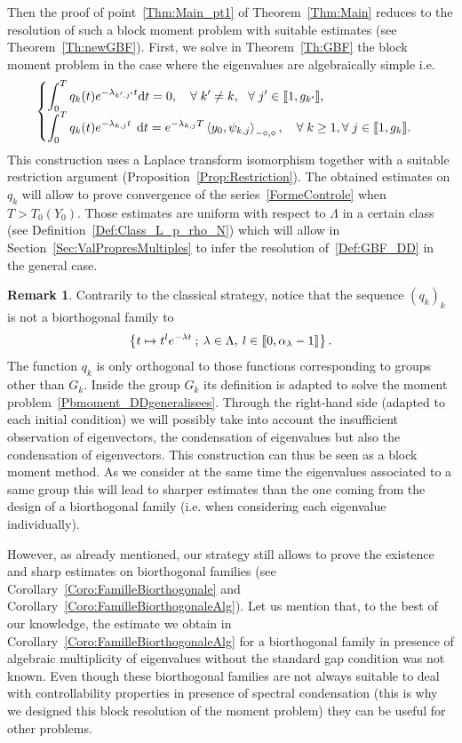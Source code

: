 \documentclass[10pt]{amsart}
\theoremstyle{definition}\newtheorem{defi}[theo]{Definition}\newtheorem{rema}[theo]{Remark}\newtheorem{exam}[theo]{Example}\newtheorem{exem}[theo]{Example}\newtheorem{nota}[theo]{Notation}
\newcommand{\llbracket}{\mathopen{[\mkern -2.7mu[}}
\newcommand{\rrbracket}{\mathclose{]\mkern -2.7mu]}}
\newcommand{\inter}[2]{\llbracket #1,#2 \rrbracket}
\newcommand{\Fzp}{Y_0}
\newcommand{\dual}[2]{\left\langle #1, #2 \right\rangle_{-\diamond,\diamond}}
\newcommand{\n}{g}
\newcommand{\md}{\mathrm{d}}
\let\oldforall\forall
\renewcommand*{\forall}{\mathrel{\oldforall}}
\begin{document}
Then the proof of point~\eqref{Thm:Main_pt1} of Theorem~\ref{Thm:Main} reduces to the resolution of such a block moment problem with suitable estimates (see Theorem~\ref{Th:newGBF}). First, we solve in Theorem~\ref{Th:GBF} the block moment problem in the case where the eigenvalues are algebraically simple i.e.
\begin{equation}\label{Def:GBF}
\begin{cases}
\displaystyle\int_0^T q_k(t) e^{-\lambda_{k',j'} t} \md t = 0, \quad \forall k' \neq k, \ \ \forall j'\in \inter{1}{\n_{k'}},
\\[0.15em]
\displaystyle \int_0^T q_k(t) e^{-\lambda_{k,j} t} \;\,\md t = e^{-\lambda_{k,j}T} \dual{y_0}{\psi_{k,j}}, \quad \forall k \geq 1, \forall j \in \inter{1}{\n_k}.
\end{cases}
\end{equation}
This construction uses a Laplace transform isomorphism together with a suitable restriction argument (Proposition~\ref{Prop:Restriction}). The obtained estimates on $q_k$ will allow to prove convergence of the series~\eqref{FormeControle} when $T>T_0(\Fzp)$. Those estimates are uniform with respect to $\Lambda$ in a certain class (see Definition~\ref{Def:Class_L_p_rho_N}) which will allow in Section~\ref{Sec:ValPropresMultiples} to infer the resolution of~\eqref{Def:GBF_DD} in the general case.

\begin{rema}
Contrarily to the classical strategy, notice that the sequence $(q_k)_k$ is not a biorthogonal family to
\[
\left\{ t \mapsto t^l e^{-\lambda t} \: ; \: \lambda \in \Lambda, \: l \in \inter{0}{\alpha_\lambda -1} \right\}.
\]
The function $q_k$ is only orthogonal to those functions corresponding to groups other than $G_k$. Inside the group $G_k$ its definition is adapted to solve the moment problem~\eqref{Pbmoment_DDgeneralisees}. Through the right-hand side (adapted to each initial condition) we will possibly take into account the insufficient observation of eigenvectors, the condensation of eigenvalues but also the condensation of eigenvectors. This construction can thus be seen as a block moment method. As we consider at the same time the eigenvalues associated to a same group this will lead to sharper estimates than the one coming from the design of a biorthogonal family (i.e. when considering each eigenvalue individually).

However, as already mentioned, our strategy still allows to prove the existence and sharp estimates on biorthogonal families (see Corollary~\ref{Coro:FamilleBiorthogonale} and Corollary~\ref{Coro:FamilleBiorthogonaleAlg}). Let us mention that, to the best of our knowledge, the estimate we obtain in Corollary~\ref{Coro:FamilleBiorthogonaleAlg} for a biorthogonal family in presence of algebraic multiplicity of eigenvalues without the standard gap condition was not known. Even though these biorthogonal families are not always suitable to deal with controllability properties in presence of spectral condensation (this is why we designed this block resolution of the moment problem) they can be useful for other problems.
\end{rema}
\end{document}
